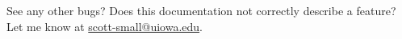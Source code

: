 \documentclass[12pt]{article}
\begin{document}
See any other bugs? Does this documentation not correctly describe a feature? Let me know at \href{mailto:scott-small@uiowa.edu}{scott-small@uiowa.edu}.






\end{document}
